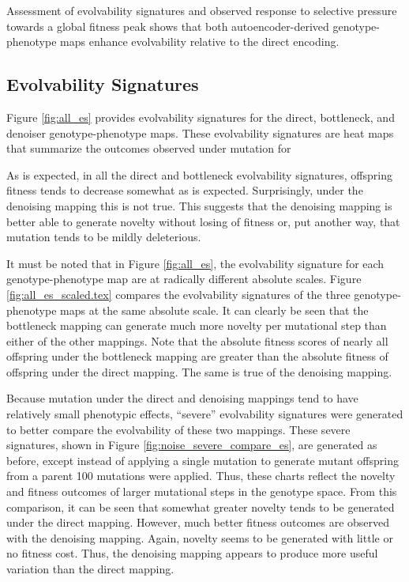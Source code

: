 Assessment of evolvability signatures and observed response to selective pressure towards a global fitness peak shows that both autoencoder-derived genotype-phenotype maps enhance evolvability relative to the direct encoding.

\subsection{Evolvability Signatures}






Figure \ref{fig:all_es} provides evolvability signatures for the direct, bottleneck, and denoiser genotype-phenotype maps.
These evolvability signatures are heat maps that summarize the outcomes observed under mutation for

As is expected, in all the direct and bottleneck evolvability signatures, offspring fitness tends to decrease somewhat as is expected.
Surprisingly, under the denoising mapping this is not true.
This suggests that the denoising mapping is better able to generate novelty without losing of fitness or, put another way, that mutation tends to be mildly deleterious.

It must be noted that in Figure \ref{fig:all_es}, the evolvability signature for each genotype-phenotype map are at radically different absolute scales.
Figure \ref{fig:all_es_scaled.tex} compares the evolvability signatures of the three genotype-phenotype maps at the same absolute scale.
It can clearly be seen that the bottleneck mapping can generate much more novelty per mutational step than either of the other mappings.
Note that the absolute fitness scores of nearly all offspring under the bottleneck mapping are greater than the absolute fitness of offspring under the direct mapping.
The same is true of the denoising mapping.

Because mutation under the direct and denoising mappings tend to have relatively small phenotypic effects, ``severe'' evolvability signatures were generated to better compare the evolvability of these two mappings.
These severe signatures, shown in Figure \ref{fig:noise_severe_compare_es}, are generated as before, except instead of applying a single mutation to generate mutant offspring from a parent 100 mutations were applied.
Thus, these charts reflect the novelty and fitness outcomes of larger mutational steps in the genotype space.
From this comparison, it can be seen that somewhat greater novelty tends to be generated under the direct mapping.
However, much better fitness outcomes are observed with the denoising mapping.
Again, novelty seems to be generated with little or no fitness cost.
Thus, the denoising mapping appears to produce more useful variation than the direct mapping.

